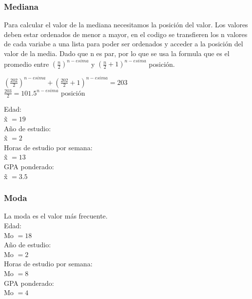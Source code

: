 \documentclass{article}
\begin{document}
\subsubsection*{Mediana}
Para calcular el valor de la mediana necesitamos la posición del valor. Los valores deben estar ordenados de menor a mayor, en el codigo se transfieren los n valores de cada variabe a una lista para poder ser ordenados y acceder a la posición del valor de la media. Dado que n es par, por lo que se usa la formula que es el promedio entre  $(\frac{n}{2})^{n-esima}$ y
$(\frac{n}{2} + 1)^{n-esima}$ posición. \\
\begin{center}
	$(\frac{202}{2})^{n-esima} + (\frac{202}{2} + 1)^{n-esima} = 203$\\
	$\frac{203}{2} = 101.5^{n-esima}$ posición\\
\end{center}
Edad:\\                                           \~x $= 19$ \vspace{0.25cm}\\
Año de estudio:\\                             \~x $= 2 $ \vspace{0.25cm}\\
Horas de estudio por semana:\\      \~x $=13 $ \vspace{0.25cm}\\
GPA ponderado:\\                           \~x $=  3.5$ \vspace{0.25cm}\\

\subsubsection*{Moda}
La moda es el valor más frecuente.\vspace{0.25cm}\\
Edad:\\                                            Mo $= 18$ \vspace{0.25cm}\\
Año de estudio:\\                            Mo $= 2$\vspace{0.25cm}\\
Horas de estudio por semana:\\      Mo $=  8$\vspace{0.25cm}\\
GPA ponderado:\\                            Mo $=  4$\vspace{0.25cm}\\
\end{document}
